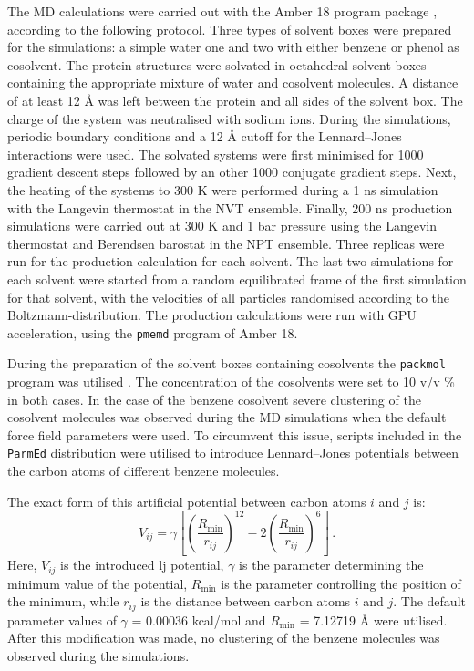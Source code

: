 The MD calculations were carried out with the Amber 18 program package \cite{amber18}, according to the following protocol.
Three types of solvent boxes were prepared for the simulations: a simple water one and two with either benzene or phenol as cosolvent.
The protein structures were solvated in octahedral solvent boxes containing the appropriate mixture of water and cosolvent molecules.
A distance of at least 12 \AA{} was left between the protein and all sides of the solvent box. The charge of the system was neutralised with sodium ions. During the simulations, periodic boundary conditions and a 12 \AA{} cutoff for the Lennard--Jones interactions were used. The solvated systems were first minimised for 1000 gradient descent steps followed by an other 1000 conjugate gradient steps. Next, the heating of the systems to 300 K were performed during a 1 ns simulation with the Langevin thermostat in the NVT ensemble. Finally, 200 ns production simulations were carried out at 300 K and 1 bar pressure using the Langevin thermostat and Berendsen barostat in the NPT ensemble. Three replicas were run for the production calculation for each solvent. The last two simulations for each solvent were started from a random equilibrated frame of the first simulation for that solvent, with the velocities of all particles randomised according to the Boltzmann-distribution.
The production calculations were run with GPU acceleration, using the \texttt{pmemd} program of Amber 18.

During the preparation of the solvent boxes containing cosolvents the \texttt{packmol} program was utilised \cite{packmol}. The concentration of the cosolvents were set to 10 v/v \% in both cases.
In the case of the benzene cosolvent severe clustering of the cosolvent molecules was observed during the MD simulations when the default force field parameters were used. To circumvent this issue, scripts included in the \texttt{ParmEd} distribution \cite{parmed} were utilised to introduce Lennard--Jones potentials between the carbon atoms of different benzene molecules.

The exact form of this artificial potential between carbon atoms $i$ and $j$ is:
\begin{equation}
V_{ij} = \gamma \left[\left(\frac{R_{\mathrm{min}}}{r_{ij}}\right)^{12} - 2 \left(\frac{R_{\mathrm{min}}}{r_{ij}}\right)^{6}\right] \, .
\end{equation}
Here, $V_{ij}$ is the introduced \gls{lj} potential, $\gamma$ is the parameter determining the minimum value of the potential, $R_{\mathrm{min}}$ is the parameter controlling the position of the minimum, while $r_{ij}$ is the distance between carbon atoms $i$ and $j$.
The default parameter values of $\gamma$ = 0.00036 kcal/mol and $R_{\mathrm{min}}$ = 7.12719 \AA{} were utilised.
After this modification was made, no clustering of the benzene molecules was observed during the simulations.

